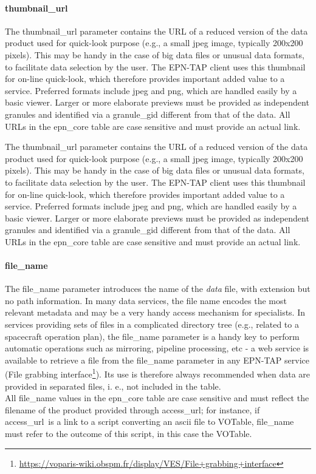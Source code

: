 \documentclass[11pt,a4paper]{ivoa}
\begin{document}
\paragraph{thumbnail\_url}

The thumbnail\_url parameter contains the URL of a reduced version of the data product used for quick-look purpose (e.g., a small jpeg image, typically 200x200 pixels). This may be handy in the case of big data files or unusual data formats, to facilitate data selection by the user. The EPN-TAP client uses this thumbnail for on-line quick-look, which therefore provides important added value to a service. Preferred formats include jpeg and png, which are handled easily by a basic viewer. Larger or more elaborate previews must be provided as independent granules and identified via a granule\_gid different from that of the data. All URLs in the epn\_core table are case sensitive and must provide an actual link.

The thumbnail\_url parameter contains the URL of a reduced version of the data product used for quick-look purpose (e.g., a small jpeg image, typically 200x200 pixels). This may be handy in the case of big data files or unusual data formats, to facilitate data selection by the user. The EPN-TAP client uses this thumbnail for on-line quick-look, which therefore provides important added value to a service. Preferred formats include jpeg and png, which are handled easily by a basic viewer. Larger or more elaborate previews must be provided as independent granules and identified via a granule\_gid different from that of the data. All URLs in the epn\_core table are case sensitive and must provide an actual link.

\paragraph{file\_name}

The file\_name parameter introduces the name of the \emph{data} file, with extension but no path information. In many data services, the file name encodes the most relevant metadata and may be a very handy access mechanism for specialists. In services providing sets of files in a complicated directory tree (e.g., related to a spacecraft operation plan), the file\_name parameter is a handy key to perform automatic operations such as mirroring, pipeline processing, etc - a web service is available to retrieve a file from the file\_name parameter in any EPN-TAP service (File grabbing interface\footnote{\url{https://voparis-wiki.obspm.fr/display/VES/File+grabbing+interface}}). Its use is therefore always recommended when data are provided in separated files, i. e., not included in the table.\\All file\_name values in the epn\_core table are case sensitive and must reflect the filename of the product provided through access\_url; for instance, if access\_url is a link to a script converting an ascii file to VOTable, file\_name must refer to the outcome of this script, in this case the VOTable.
\end{document}

